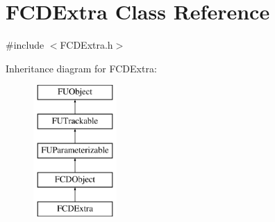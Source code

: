 \hypertarget{classFCDExtra}{
\section{FCDExtra Class Reference}
\label{classFCDExtra}
}


{\ttfamily \#include $<$FCDExtra.h$>$}

Inheritance diagram for FCDExtra:\begin{figure}[H]
\begin{center}
\leavevmode
\includegraphics[height=5.000000cm]{classFCDExtra}
\end{center}
\end{figure}
